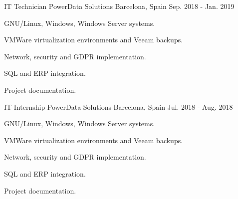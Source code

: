 \begin{cventries}

\cventry
{IT Technician} %
{PowerData Solutions} %
{Barcelona, Spain} %
{Sep. 2018 - Jan. 2019} %
{ %
\begin{cvitems}
\item {GNU/Linux, Windows, Windows Server systems.}
\item {VMWare virtualization environments and Veeam backups.}
\item {Network, security and GDPR implementation.}
\item {SQL and ERP integration.}
\item {Project documentation.}
\end{cvitems}
}


\cventry
{IT Internship} %
{PowerData Solutions} %
{Barcelona, Spain} %
{Jul. 2018 - Aug. 2018} %
{ %
\begin{cvitems}
\item {GNU/Linux, Windows, Windows Server systems.}
\item {VMWare virtualization environments and Veeam backups.}
\item {Network, security and GDPR implementation.}
\item {SQL and ERP integration.}
\item {Project documentation.}
\end{cvitems}
}


\end{cventries}